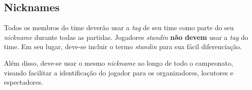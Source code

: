 \subsection{Nicknames}

Todos os membros do time deverão usar a \textit{tag} de seu time como parte do seu \textit{nickname} durante todas as partidas. Jogadores \textit{standin} \textbf{não devem} usar a \textit{tag} do time. Em seu lugar, deve-se incluir o termo \textit{standin} para sua fácil diferenciação.

Além disso, deve-se usar o mesmo \textit{nickname} ao longo de todo o campeonato, visando facilitar a identificação do jogador para os organizadores, locutores e espectadores.